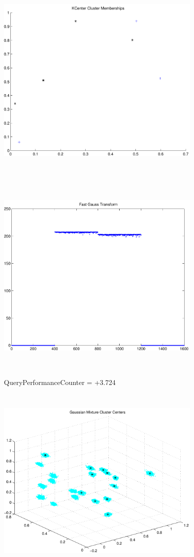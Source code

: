 \documentclass[9pt]{article}
\theoremstyle{plain}
\theoremstyle{definition}
\theoremstyle{remark}
\numberwithin{equation}{section}
\begin{document}
\includegraphics[width=10.0cm,height=10.0cm]{KCenterClusterMemberships_4_Centers.pdf}

\includegraphics[width=10.0cm,height=10.0cm]{FGT4_Centers.pdf}

QueryPerformanceCounter  =  +3.724
\includegraphics[width=10.0cm,height=10.0cm]{GaussianMixture_ClusterCenters20_Centers.pdf}
\end{document}
